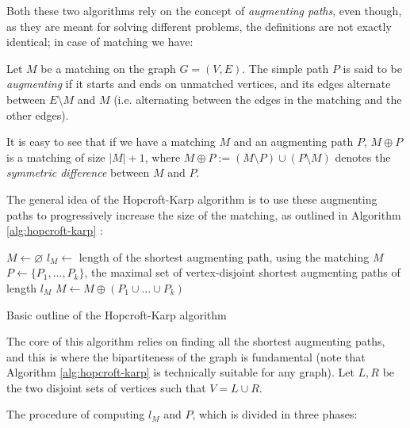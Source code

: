 Both these two algorithms rely on the concept of \emph{augmenting paths}, even though, as they are meant for solving different problems, the definitions are not exactly identical; in case of matching we have:

\begin{definition}
	Let $M$ be a matching on the graph $G=(V,E)$. The simple path $P$ is said to be \emph{augmenting} if it starts and ends on unmatched vertices, and its edges alternate between $E \setminus M$ and $M$ (i.e. alternating between the edges in the matching and the other edges).
\end{definition}

It is easy to see that if we have a matching $M$ and an augmenting path $P$, $M \oplus P$ is a matching of size $|M|+1$, where $M \oplus P := (M \setminus P) \cup (P \setminus M)$ denotes the \emph{symmetric difference} between $M$ and $P$. 

The general idea of the Hopcroft-Karp algorithm is to use these augmenting paths to progressively increase the size of the matching, as outlined in Algorithm \ref{alg:hopcroft-karp} \cite{hopcroft_karp}:

\begin{algorithm}[h]
	\begin{algorithmic}
	\State $M \gets \varnothing$
	\Repeat
	\State $l_M \gets$ length of the shortest augmenting path, using the matching $M$
	\State $P \gets \{ P_1,\dots,P_k \}$, the maximal set of vertex-disjoint shortest augmenting paths of length $l_M$
	\State $M \gets M \oplus (P_1 \cup \dots \cup P_k )$
\end{algorithmic}
\caption{Basic outline of the Hopcroft-Karp algorithm} \label{alg:hopcroft-karp}
\end{algorithm}

The core of this algorithm relies on finding all the shortest augmenting paths, and this is where the bipartiteness of the graph is fundamental (note that Algorithm \ref{alg:hopcroft-karp} is technically suitable for any graph). Let $L,R$ be the two disjoint sets of vertices such that $V = L \cup R$.

The procedure of computing $l_M$ and $P$, which is divided in three phases:

